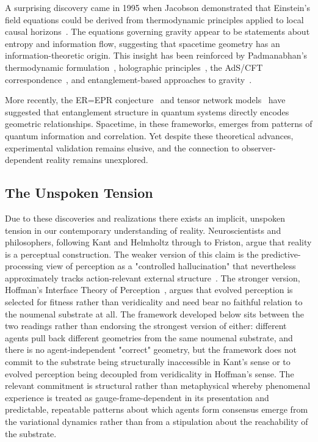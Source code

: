 \documentclass[11pt]{article}
\begin{document}
A surprising discovery came in 1995 when Jacobson demonstrated that Einstein's field equations could be derived from thermodynamic principles applied to local causal horizons~\cite{Jacobson1995}. The equations governing gravity appear to be statements about entropy and information flow, suggesting that spacetime geometry has an information-theoretic origin. This insight has been reinforced by Padmanabhan's thermodynamic formulation~\cite{Padmanabhan2010}, holographic principles~\cite{Bousso2002}, the AdS/CFT correspondence~\cite{Maldacena1999}, and entanglement-based approaches to gravity~\cite{VanRaamsdonk2010}.

More recently, the ER=EPR conjecture~\cite{MaldacenaSusskind2013} and tensor network models~\cite{Swingle2012} have suggested that entanglement structure in quantum systems directly encodes geometric relationships. Spacetime, in these frameworks, emerges from patterns of quantum information and correlation. Yet despite these theoretical advances, experimental validation remains elusive, and the connection to observer-dependent reality remains unexplored.

\subsection{The Unspoken Tension}

Due to these discoveries and realizations there exists an implicit, unspoken tension in our contemporary understanding of reality. Neuroscientists and philosophers, following Kant and Helmholtz through to Friston, argue that reality is a perceptual construction. The weaker version of this claim is the predictive-processing view of perception as a "controlled hallucination" that nevertheless approximately tracks action-relevant external structure~\cite{Clark2016, Seth2021}. The stronger version, Hoffman's Interface Theory of Perception~\cite{Hoffman2019}, argues that evolved perception is selected for fitness rather than veridicality and need bear no faithful relation to the noumenal substrate at all. The framework developed below sits between the two readings rather than endorsing the strongest version of either: different agents pull back different geometries from the same noumenal substrate, and there is no agent-independent "correct" geometry, but the framework does not commit to the substrate being structurally inaccessible in Kant's sense or to evolved perception being decoupled from veridicality in Hoffman's sense. The relevant commitment is structural rather than metaphysical whereby phenomenal experience is treated as gauge-frame-dependent in its presentation and predictable, repeatable patterns about which agents form consensus emerge from the variational dynamics rather than from a stipulation about the reachability of the substrate.
\end{document}
